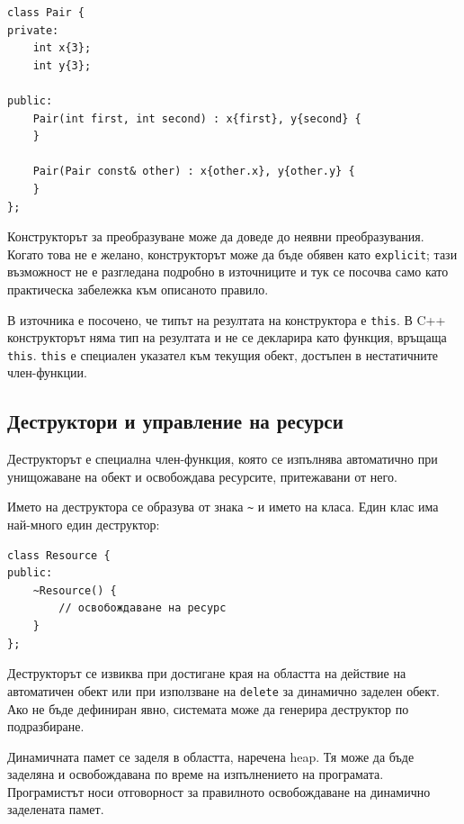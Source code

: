 \begin{verbatim}
class Pair {
private:
    int x{3};
    int y{3};

public:
    Pair(int first, int second) : x{first}, y{second} {
    }

    Pair(Pair const& other) : x{other.x}, y{other.y} {
    }
};
\end{verbatim}

Конструкторът за преобразуване може да доведе до неявни преобразувания. Когато това не е желано, конструкторът може да бъде обявен като \texttt{explicit}; тази възможност не е разгледана подробно в източниците и тук се посочва само като практическа забележка към описаното правило.

\begin{supp}[Бележка]
В източника е посочено, че типът на резултата на конструктора е \texttt{this}. В C++ конструкторът няма тип на резултата и не се декларира като функция, връщаща \texttt{this}. \texttt{this} е специален указател към текущия обект, достъпен в нестатичните член-функции.
\end{supp}

\subsection{Деструктори и управление на ресурси}\label{s:16.2.3}

\begin{defn}
Деструкторът е специална член-функция, която се изпълнява автоматично при унищожаване на обект и освобождава ресурсите, притежавани от него.
\end{defn}

Името на деструктора се образува от знака \texttt{\~} и името на класа. Един клас има най-много един деструктор:

\begin{verbatim}
class Resource {
public:
    ~Resource() {
        // освобождаване на ресурс
    }
};
\end{verbatim}

Деструкторът се извиква при достигане края на областта на действие на автоматичен обект или при използване на \texttt{delete} за динамично заделен обект. Ако не бъде дефиниран явно, системата може да генерира деструктор по подразбиране.

Динамичната памет се заделя в областта, наречена heap. Тя може да бъде заделяна и освобождавана по време на изпълнението на програмата. Програмистът носи отговорност за правилното освобождаване на динамично заделената памет.

